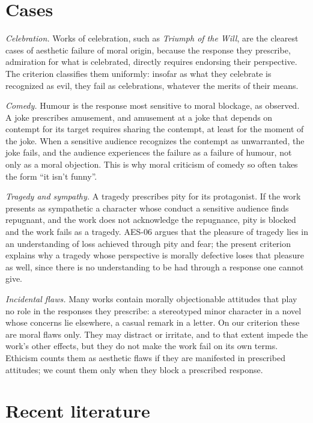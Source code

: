 \documentclass{situationist-preprint}
\begin{document}
\section{Cases}

\emph{Celebration.} Works of celebration, such as \emph{Triumph of the Will}, are the clearest cases of aesthetic failure of moral origin, because the response they prescribe, admiration for what is celebrated, directly requires endorsing their perspective. The criterion classifies them uniformly: insofar as what they celebrate is recognized as evil, they fail as celebrations, whatever the merits of their means.

\emph{Comedy.} Humour is the response most sensitive to moral blockage, as \citet{Carroll1996} observed. A joke prescribes amusement, and amusement at a joke that depends on contempt for its target requires sharing the contempt, at least for the moment of the joke. When a sensitive audience recognizes the contempt as unwarranted, the joke fails, and the audience experiences the failure as a failure of humour, not only as a moral objection. This is why moral criticism of comedy so often takes the form \enquote{it isn't funny}.

\emph{Tragedy and sympathy.} A tragedy prescribes pity for its protagonist. If the work presents as sympathetic a character whose conduct a sensitive audience finds repugnant, and the work does not acknowledge the repugnance, pity is blocked and the work fails as a tragedy. AES-06 argues that the pleasure of tragedy lies in an understanding of loss achieved through pity and fear; the present criterion explains why a tragedy whose perspective is morally defective loses that pleasure as well, since there is no understanding to be had through a response one cannot give.

\emph{Incidental flaws.} Many works contain morally objectionable attitudes that play no role in the responses they prescribe: a stereotyped minor character in a novel whose concerns lie elsewhere, a casual remark in a letter. On our criterion these are moral flaws only. They may distract or irritate, and to that extent impede the work's other effects, but they do not make the work fail on its own terms. Ethicism counts them as aesthetic flaws if they are manifested in prescribed attitudes; we count them only when they block a prescribed response.

\section{Recent literature}
\end{document}
